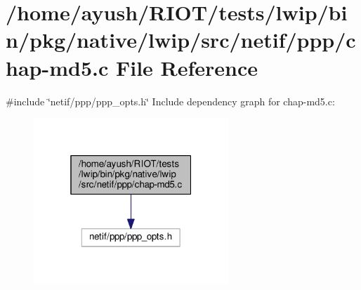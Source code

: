 \hypertarget{native_2lwip_2src_2netif_2ppp_2chap-md5_8c}{}\section{/home/ayush/\+R\+I\+O\+T/tests/lwip/bin/pkg/native/lwip/src/netif/ppp/chap-\/md5.c File Reference}
\label{native_2lwip_2src_2netif_2ppp_2chap-md5_8c}
{\ttfamily \#include \char`\"{}netif/ppp/ppp\+\_\+opts.\+h\char`\"{}}\newline
Include dependency graph for chap-\/md5.c\+:
\nopagebreak
\begin{figure}[H]
\begin{center}
\leavevmode
\includegraphics[width=208pt]{native_2lwip_2src_2netif_2ppp_2chap-md5_8c__incl}
\end{center}
\end{figure}
